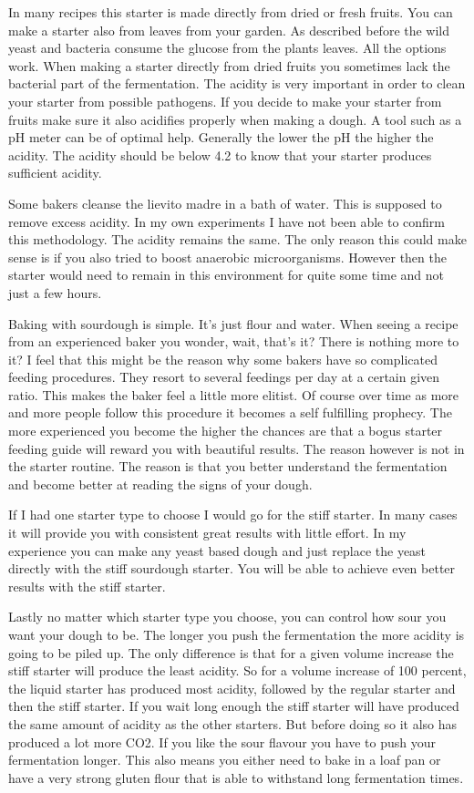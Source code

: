 In many recipes this starter is made directly
from dried or fresh fruits. You can make a starter also from leaves from your
garden. As described before the wild yeast and bacteria consume the glucose
from the plants leaves. All the options work. When making a starter directly
from dried fruits you sometimes lack the bacterial part of the fermentation.
The acidity is very important in order to clean your starter from possible
pathogens. If you decide to make your starter from fruits make sure it also
acidifies properly when making a dough. A tool such as a pH meter can be of
optimal help. Generally the lower the pH the higher the acidity. The acidity
should be below 4.2 to know that your starter produces sufficient acidity.

Some bakers cleanse the lievito madre in a bath of water. This is supposed to
remove excess acidity. In my own experiments I have not been able to confirm
this methodology. The acidity remains the same. The only reason this could
make sense is if you also tried to boost anaerobic microorganisms. However then the
starter would need to remain in this environment for quite some time and not just
a few hours.

Baking with sourdough is simple. It's just flour and water. When seeing a recipe
from an experienced baker you wonder, wait, that's it? There is nothing more
to it? I feel that this might be the reason why some bakers have so complicated
feeding procedures. They resort to several feedings per day at a certain given ratio.
This makes the baker feel a little more elitist. Of course over time as
more and more people follow this procedure it becomes a self fulfilling prophecy.
The more experienced you become the higher the chances are that a bogus starter
feeding guide will reward you with beautiful results. The reason however is
not in the starter routine. The reason is that you better understand the fermentation
and become better at reading the signs of your dough.

If I had one starter type to choose I would go for the stiff starter. In many cases
it will provide you with consistent great results with little effort.
In my experience you can make any yeast based dough and just replace
the yeast directly with the stiff sourdough starter. You will be able
to achieve even better results with the stiff starter.

Lastly no matter which starter type you choose, you can control how sour
you want your dough to be. The longer you push the fermentation the more
acidity is going to be piled up. The only difference is that for a given
volume increase the stiff starter will produce the least acidity. So for a
volume increase of 100 percent, the liquid starter has produced most acidity,
followed by the regular starter and then the stiff starter. If you wait long
enough the stiff starter will have produced the same amount of acidity as the
other starters. But before doing so it also has produced a lot more CO2. If
you like the sour flavour you have to push your fermentation longer. This also
means you either need to bake in a loaf pan or have a very strong gluten flour
that is able to withstand long fermentation times.
